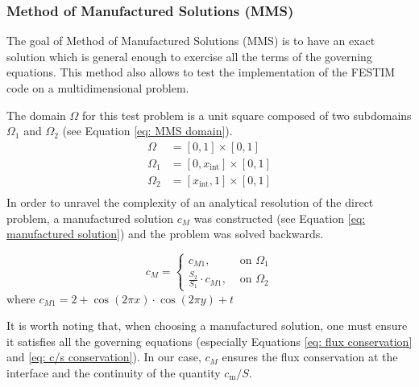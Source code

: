\subsubsection{Method of Manufactured Solutions (MMS)}

The goal of Method of Manufactured Solutions (MMS) is to have an exact solution which is general enough to exercise all the terms of the governing equations.
This method also allows to test the implementation of the FESTIM code on a multidimensional problem.

The domain $\Omega$ for this test problem is a unit square composed of two subdomains $\Omega_1$ and $\Omega_2$ (see Equation \ref{eq: MMS domain}).
\begin{subequations} \label{eq: MMS domain}
\begin{align}
    \Omega &= [0, 1] \times [0, 1] \\
    \Omega_1 &= [0, x_\mathrm{int}] \times [0, 1] \\
    \Omega_2 &= [x_\mathrm{int}, 1] \times [0, 1] \\
\end{align}
\end{subequations}
In order to unravel the complexity of an analytical resolution of the direct problem, a manufactured solution $c_M$ was constructed (see Equation \ref{eq: manufactured solution}) and the problem was solved backwards.

\begin{equation}
        c_M= 
\begin{cases}
    c_{M1},& \text{ on } \Omega_1\\
    \frac{S_2}{S_1} \cdot c_{M1},& \text{ on } \Omega_2
\end{cases}
\label{eq: manufactured solution}
\end{equation}
where $c_{M1} = 2 + \cos(2\pi x) \cdot \cos(2\pi y) + t$

It is worth noting that, when choosing a manufactured solution, one must ensure it satisfies all the governing equations (especially Equations \ref{eq: flux conservation} and \ref{eq: c/s conservation}).
In our case, $c_M$ ensures the flux conservation at the interface and the continuity of the quantity $c_\mathrm{m}/S$.

